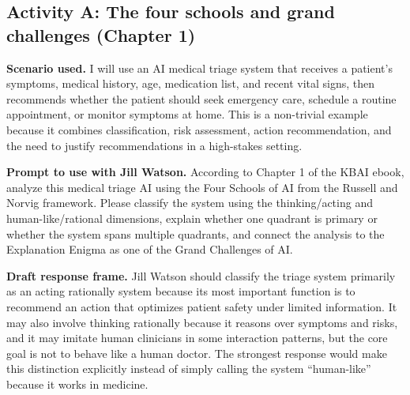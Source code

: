 \documentclass[
	letterpaper, %
]{jdf}
\begin{document}
\subsection{Activity A: The four schools and grand challenges (Chapter 1)}

%
%
%

\textbf{Scenario used.} I will use an AI medical triage system that receives a patient's symptoms, medical history, age, medication list, and recent vital signs, then recommends whether the patient should seek emergency care, schedule a routine appointment, or monitor symptoms at home. This is a non-trivial example because it combines classification, risk assessment, action recommendation, and the need to justify recommendations in a high-stakes setting.

\textbf{Prompt to use with Jill Watson.} According to Chapter 1 of the KBAI ebook, analyze this medical triage AI using the Four Schools of AI from the Russell and Norvig framework. Please classify the system using the thinking/acting and human-like/rational dimensions, explain whether one quadrant is primary or whether the system spans multiple quadrants, and connect the analysis to the Explanation Enigma as one of the Grand Challenges of AI.

\textbf{Draft response frame.} Jill Watson should classify the triage system primarily as an acting rationally system because its most important function is to recommend an action that optimizes patient safety under limited information. It may also involve thinking rationally because it reasons over symptoms and risks, and it may imitate human clinicians in some interaction patterns, but the core goal is not to behave like a human doctor. The strongest response would make this distinction explicitly instead of simply calling the system ``human-like'' because it works in medicine.
\end{document}
